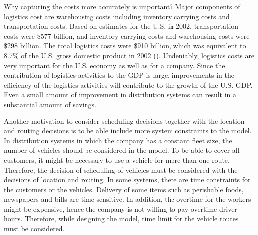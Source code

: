 Why capturing the costs more accurately is important? 
Major components of logistics cost are warehousing costs including inventory carrying costs 
and transportation costs. Based on estimates for the U.S. in 2002, transportation costs 
were \$577 billion, and inventory carrying costs and warehousing costs were \$298 billion. 
The total logistics costs were \$910 billion, which was equivalent to 8.7\% of the U.S. gross 
domestic product in 2002 (\citet{MacroSys}). Undeniably, logistics
costs are very important for the U.S. economy as well as for a company. 
Since the contribution of logistics activities to the GDP is
large, improvements in the efficiency of the logistics activities will contribute to the 
growth of the U.S. GDP.  Even a small amount of improvement in distribution systems
can result in a substantial amount of savings. 

Another motivation to consider scheduling decisions together with the location
and routing decisions is to be able include more system constraints to the model. 
In distribution systems in which  the company has a constant fleet size, the number 
of vehicles should be considered in the model. To be able to cover all customers,
it might be necessary to use a vehicle for more than one route. Therefore, the 
decision of scheduling of vehicles must be considered with the decisions of 
location and routing.  
In some systems, there are time constraints for the customers or
the vehicles. Delivery of some items such as perishable foods, newspapers and
bills are time sensitive. In addition, the overtime for the workers might
be expensive, hence the company is not willing to pay overtime driver hours.
Therefore, while designing the model, time limit for the vehicle routes must be
considered.   









